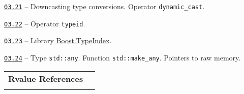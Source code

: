 \documentclass[a4paper,12pt]{article}
\renewenvironment{itemize}
{
    \begin{list}{\labelitemi}
    {
      \setlength{\topsep}{0pt}
      \setlength{\partopsep}{0pt}
      \setlength{\parskip}{0pt}
      \setlength{\itemsep}{0pt}
      \setlength{\parsep}{0pt}
      \setlength{\leftmargin}{14.5pt}
    }
}{\end{list}}
\begin{document}
\begin{itemize}

    \item \href{https://github.com/i-s-m-mipt/Education/blob/master/projects/examples/source/03.21.cpp}{\texttt{03.21}} -- Downcasting type conversions. Operator \lstinline{dynamic_cast}.

    \smallskip

    \item \href{https://github.com/i-s-m-mipt/Education/blob/master/projects/examples/source/03.22.cpp}{\texttt{03.22}} -- Operator \lstinline{typeid}.

    \smallskip

    \item \href{https://github.com/i-s-m-mipt/Education/blob/master/projects/examples/source/03.23.cpp}{\texttt{03.23}} -- Library \href{https://www.boost.org/doc/libs/1_84_0/doc/html/boost_typeindex.html}{Boost.TypeIndex}.

    \smallskip

    \item \href{https://github.com/i-s-m-mipt/Education/blob/master/projects/examples/source/03.24.cpp}{\texttt{03.24}} -- Type \lstinline{std::any}. Function \lstinline{std::make_any}. Pointers to raw memory.

\end{itemize}

\bigskip\medskip

\begin{tabular}{!{\vrule width 1pt}L{3.6cm}!{\vrule width 1pt}L{15.4cm}!{\vrule width 0pt}} 


\textbf{Rvalue References} & \\


\end{tabular}

\medskip\smallskip
\end{document}
